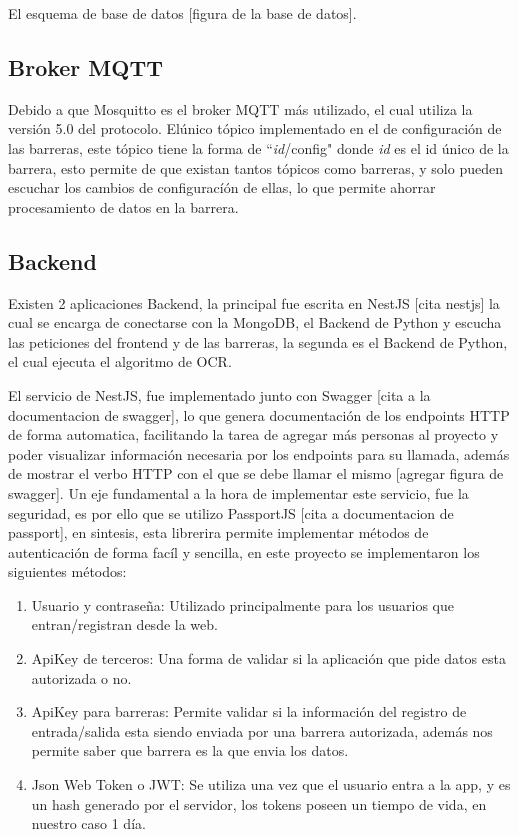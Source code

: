 El esquema de base de datos [figura de la base de datos].

\subsection{Broker MQTT}

Debido a que Mosquitto es el broker MQTT más utilizado, el cual utiliza la versión 5.0 del protocolo. Elúnico tópico implementado en el de configuración de las barreras, este tópico tiene la forma de ``\textit{id}/config" donde \textit{id} es el id único de la barrera, esto permite de que existan tantos tópicos como barreras, y solo pueden escuchar los cambios de configuracíón de ellas, lo que permite ahorrar procesamiento de datos en la barrera.

\subsection{Backend}

Existen 2 aplicaciones Backend, la principal fue escrita en NestJS [cita nestjs] la cual se encarga de conectarse con la MongoDB, el Backend de Python y escucha las peticiones del frontend y de las barreras, la segunda es el Backend de Python, el cual ejecuta el algoritmo de OCR.

El servicio de NestJS, fue implementado junto con Swagger [cita  a la documentacion de swagger], lo que genera documentación de los endpoints HTTP de forma automatica, facilitando la tarea de agregar más personas al proyecto y poder visualizar información necesaria por los endpoints para su llamada, además de mostrar el verbo HTTP con el que se debe llamar el mismo [agregar figura de swagger]. Un eje fundamental a la hora de implementar este servicio, fue la seguridad, es por ello que se utilizo PassportJS [cita a documentacion de passport], en sintesis, esta librerira permite implementar métodos de autenticación de forma facíl y sencilla, en este proyecto se implementaron los siguientes métodos:

\begin{enumerate}
    \item Usuario y contraseña: Utilizado principalmente para los usuarios que entran/registran desde la web.
    \item ApiKey de terceros: Una forma de validar si la aplicación que pide datos esta autorizada o no.
    \item ApiKey para barreras: Permite validar si la información del registro de entrada/salida esta siendo enviada por una barrera autorizada, además nos permite saber que barrera es la que envia los datos.
    \item Json Web Token o JWT: Se utiliza una vez que el usuario entra a la app, y es un hash generado por el servidor, los tokens poseen un tiempo de vida, en nuestro caso 1 día.
\end{enumerate}

